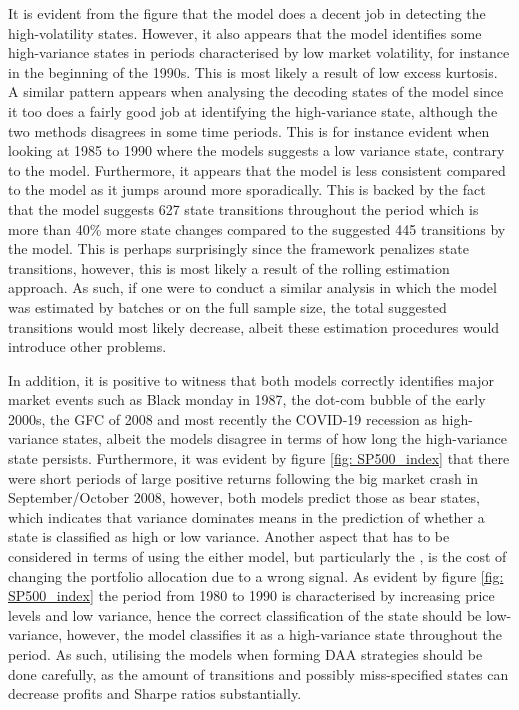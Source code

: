 It is evident from the figure that the \mle model does a decent job in detecting the high-volatility states. However, it also appears that the model identifies some high-variance states in periods characterised by low market volatility, for instance in the beginning of the 1990s. This is most likely a result of low excess kurtosis. A similar pattern appears when analysing the decoding states of the \jump model since it too does a fairly good job at identifying the high-variance state, although the two methods disagrees in some time periods. This is for instance evident when looking at 1985 to 1990 where the \mle models suggests a low variance state, contrary to the \jump model. Furthermore, it appears that the \jump model is less consistent compared to the \mle model as it jumps around more sporadically. This is backed by the fact that the \jump model suggests 627 state transitions throughout the period which is more than 40\% more state changes compared to the suggested 445 transitions by the \mle model. This is perhaps surprisingly since the \jump framework penalizes state transitions, however, this is most likely a result of the rolling estimation approach. As such, if one were to conduct a similar analysis in which the \jump model was estimated by batches or on the full sample size, the total suggested transitions would most likely decrease, albeit these estimation procedures would introduce other problems. 

In addition, it is positive to witness that both models correctly identifies major market events such as Black monday in 1987, the dot-com bubble of the early 2000s, the GFC of 2008 and most recently the COVID-19 recession as high-variance states, albeit the models disagree in terms of how long the high-variance state persists. Furthermore, it was evident by figure \ref{fig: SP500_index} that there were short periods of large positive returns following the big market crash in September/October 2008, however, both models predict those as bear states, which indicates that variance dominates means in the prediction of whether a state is classified as high or low variance. Another aspect that has to be considered in terms of using the either model, but particularly the \jump, is the cost of changing the portfolio allocation due to a wrong signal. As evident by figure \ref{fig: SP500_index} the period from 1980 to 1990 is characterised by increasing price levels and low variance, hence the correct classification of the state should be low-variance, however, the \jump model classifies it as a high-variance state throughout the period. As such, utilising the models when forming DAA strategies should be done carefully, as the amount of transitions and possibly miss-specified states can decrease profits and Sharpe ratios substantially.  

